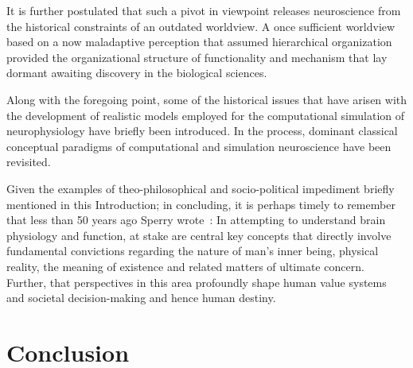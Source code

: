\documentclass[10pt,letterpaper]{article}
\begin{document}
It is further postulated that such a pivot in viewpoint releases neuroscience from the historical constraints of an outdated worldview. A once sufficient worldview based on a now maladaptive perception that assumed hierarchical organization provided the organizational structure of functionality and mechanism that lay dormant awaiting discovery in the biological sciences.

Along with the foregoing point, some of the historical issues that have arisen with the development of realistic models employed for the computational simulation of neurophysiology have briefly been introduced. In the process, dominant classical conceptual paradigms of computational and simulation neuroscience have been revisited.

Given the examples of theo-philosophical and socio-political impediment briefly mentioned in this Introduction; in concluding, it is perhaps timely to remember that less than 50 years ago Sperry wrote~\cite{sperry80}: In attempting to understand brain physiology and function, at stake are central key concepts that directly involve fundamental convictions regarding the nature of man's inner being, physical reality, the meaning of existence and related matters of ultimate concern. Further, that perspectives in this area profoundly shape human value systems and societal decision-making and hence human destiny.

\section*{Conclusion}


\end{document}

